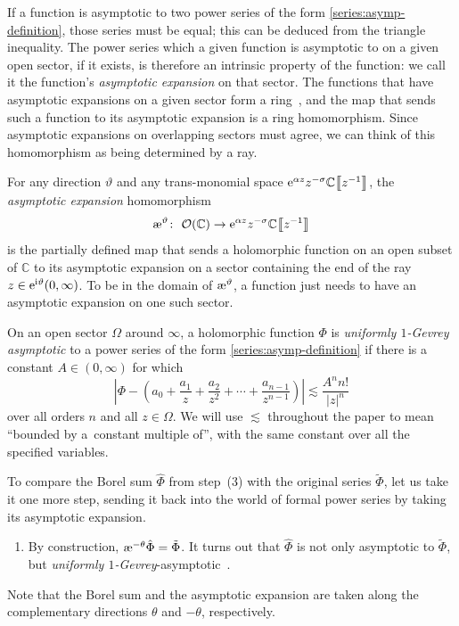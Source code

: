 \documentclass[pdftex]{sigma}
\newcommand{\C}{\mathbb{C}}
\newcommand{\series}[1]{\tilde{#1}}
\newcommand{\aexp}{\text{\rm \ae}}
\numberwithin{equation}{section}
\begin{document}
If a function is asymptotic to two power series of the form \eqref{series:asymp-definition}, those series must be equal; this can be deduced from the triangle inequality. The power series which a given function is asymptotic to on a given open sector, if it exists, is therefore an intrinsic property of the function: we call it the function's {\em asymptotic expansion} on that sector. The functions that have asymptotic expansions on a given sector form a ring~\cite[Appendix~A.4]{nikolaev2023existence}, and the map that sends such a function to its asymptotic expansion is a ring homomorphism. Since asymptotic expansions on overlapping sectors must agree, we can think of this homomorphism as being determined by a ray.
\begin{Definition}
For any direction $\vartheta$ and any trans-monomial space ${\rm e}^{\alpha z} z^{-\sigma} \C \big\llbracket z^{-1} \big\rrbracket$, the {\em asymptotic expansion} homomorphism
\[
 \aexp^\vartheta \colon\ \mathcal{O}(\C) \to {\rm e}^{\alpha z} z^{-\sigma} \C \big\llbracket z^{-1} \big\rrbracket\]
is the partially defined map that sends a holomorphic function on an open subset of $\C$ to its asymptotic expansion on a sector containing the end of the ray $z \in {\rm e}^{{\rm i}\vartheta}(0, \infty)$. To be in the domain of $\aexp^\vartheta$, a function just needs to have an asymptotic expansion on one such sector.
\end{Definition}
\begin{Definition}\label{def:unif-gevrey-asymp}
On an open sector $\Omega$ around $\infty$, a holomorphic function $\Phi$ is {\em uniformly $1$-Gevrey asymptotic} to a power series of the form \eqref{series:asymp-definition} if there is a constant $A \in (0, \infty)$ for which
\[ \left|\Phi - \left(a_0 + \frac{a_1}{z} + \frac{a_2}{z^2} + \cdots + \frac{a_{n-1}}{z^{n-1}} \right) \right| \lesssim \frac{A^n n!}{|z|^n} \]
over all orders $n$ and all $z \in \Omega$. We will use $\lesssim$ throughout the paper to mean ``bounded by a~constant multiple of'', with the same constant over all the specified variables.
\end{Definition}
To compare the Borel sum $\hat{\Phi}$ from step~(3) with the original series $\series{\Phi}$, let us take it one more step, sending it back into the world of formal power series by taking its asymptotic expansion.
\begin{enumerate}[start=4]\itemsep=0pt
\item[(4)] By construction, $\aexp^{-\theta} \hat{\Phi} = \series{\Phi}$. It turns out that $\hat{\Phi}$ is not only asymptotic to $\series{\Phi}$, but {\em {uniformly} $1$-Gevrey}-asymptotic~\cite[Corollary~5.23]{diverg-resurg-i}.
\end{enumerate}
Note that the Borel sum and the asymptotic expansion are taken along the complementary directions $\theta$ and $-\theta$, respectively.
\end{document}
